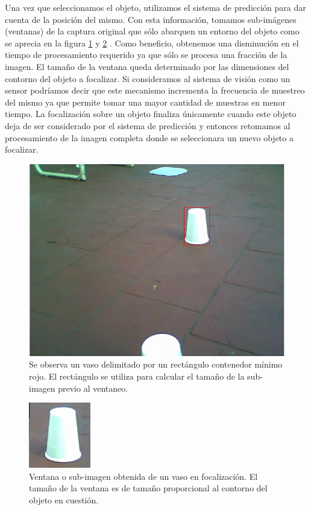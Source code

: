 	\indent Una vez que seleccionamos el objeto, utilizamos el sistema de 
	predicción para dar cuenta de la posición del mismo. Con esta 
	información, tomamos sub-imágenes (ventanas) de la captura original 
	que sólo abarquen un entorno del objeto como se aprecia en la figura 
	\ref{fig:ventaneo} y \ref{fig:ventaneo_2} . Como beneficio, 
	obtenemos una 
	disminución en el tiempo de procesamiento requerido ya que sólo se procesa una fracción de 
	la imagen. El tamaño de la ventana queda determinado por 
	las dimensiones del contorno del objeto a focalizar. Si consideramos 
	al sistema de visión como un sensor podríamos decir que este 
	mecanismo incrementa la frecuencia de muestreo del mismo ya que 
	permite tomar una mayor cantidad de muestras en menor tiempo. La 
	focalización sobre un objeto finaliza únicamente cuando este objeto 
	deja de ser considerado por el sistema de predicción y entonces 
	retomamos al  procesamiento de la imagen completa donde se 
	seleccionara un nuevo objeto a focalizar. 

\begin{figure}[htpb]
\begin{center}
  \includegraphics[scale=0.4]{figuras/ventana-1.png}
\end{center}
  \caption{\small Se observa un vaso delimitado por un rectángulo 
  contenedor mínimo rojo. El rectángulo se utiliza para calcular el 
  tamaño de la sub-imagen previo al ventaneo.}
  \label{fig:ventaneo}
\end{figure}


\begin{figure}[htpb]
\begin{center}
  \includegraphics[scale=0.6]{figuras/ventana-2.png}
\end{center}
  \caption{\small Ventana o sub-imagen obtenida de un vaso en 
  focalización. El tamaño de la ventana es de tamaño proporcional al 
  contorno del objeto en cuestión.}
  \label{fig:ventaneo_2}
\end{figure}

